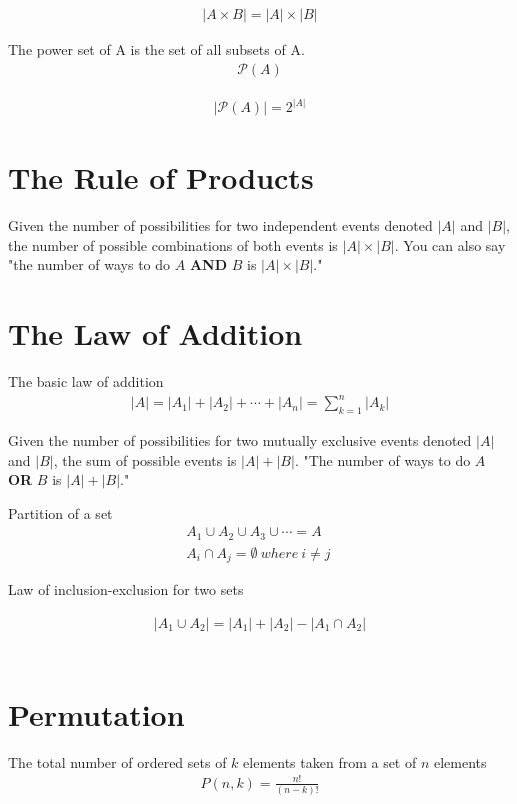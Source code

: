 \documentclass{article}
\begin{document}
\begin{gather*}
    |A \times B| = |A| \times |B|
\end{gather*}

The power set of A is the set of all subsets of A.
\begin{gather*}
    \mathcal{P}(A)
\end{gather*}

\begin{gather*}
    |\mathcal{P}(A)| = 2^{|A|}
\end{gather*}

\section{The Rule of Products}
Given the number of possibilities for two independent events denoted $|A|$ and $|B|$, the number of possible combinations of both events is $|A| \times |B|$. You can also say "the number of ways to do $A$ \textbf{AND} $B$ is $|A| \times |B|$."

\section{The Law of Addition}

The basic law of addition
\begin{gather*}
    |A| = |A_1| + |A_2| + \cdots + |A_n| = \sum_{k=1}^{n} |A_k|
\end{gather*}

Given the number of possibilities for two mutually exclusive events denoted $|A|$ and $|B|$, the sum of possible events is $|A| + |B|$. "The number of ways to do $A$ \textbf{OR} $B$ is $|A| + |B|$."

Partition of a set
\begin{gather*}
    A_1 \cup A_2 \cup A_3 \cup \cdots = A \\
    A_i \cap A_j = \emptyset\ where\ i \neq j\
\end{gather*}

Law of inclusion-exclusion for two sets

\begin{gather*}
    |A_1 \cup A_2| = |A_1| + |A_2| - |A_1 \cap A_2|
\end{gather*}

\begin{gather*}
\end{gather*}

\section{Permutation}
The total number of ordered sets of $k$ elements taken from a set of $n$ elements
\begin{gather*}
    P(n,k) = \frac{n!}{(n-k)!}
\end{gather*}
\end{document}
